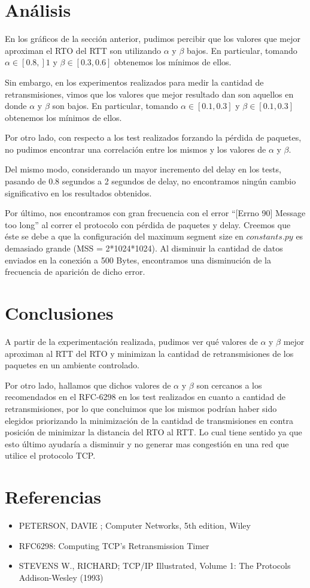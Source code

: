 \documentclass[10pt, a4paper]{article}
\begin{document}
\newpage
\section{Análisis}
En los gráficos de la sección anterior, pudimos percibir que los valores que mejor aproximan el RTO del RTT son utilizando $\alpha$ y $\beta$ bajos. En particular, tomando $ \alpha \in [0.8,]1$ y $ \beta \in [0.3,0.6]$ obtenemos los mínimos de ellos. 

Sin embargo, en los experimentos realizados para medir la cantidad de retransmisiones, vimos que los valores que mejor resultado dan son aquellos en donde $\alpha$ y $\beta$ son bajos. En particular, tomando $\alpha \in [0.1,0.3]$ y $\beta \in [0.1,0.3]$ obtenemos los mínimos de ellos.

Por otro lado, con respecto a los test realizados forzando la pérdida de paquetes, no pudimos encontrar una correlación entre los mismos y los valores de $\alpha$ y $\beta$.

Del mismo modo, considerando un mayor incremento del delay en los tests, pasando de 0.8 segundos a 2 segundos de delay, no encontramos ningún cambio significativo en los resultados obtenidos.

Por último, nos encontramos con gran frecuencia con el error ``[Errno 90] Message too long'' al correr el protocolo con pérdida de paquetes y delay. Creemos que éste se debe a que la configuración del maximum segment size en $constants.py$ es demasiado grande (MSS = 2*1024*1024). Al disminuir la cantidad de datos enviados en la conexión a 500 Bytes, encontramos una disminución de la frecuencia de aparición de dicho error.

\section{Conclusiones}
A partir de la experimentación realizada, pudimos ver qué valores de $\alpha$ y $\beta$ mejor aproximan al RTT del RTO y minimizan la cantidad de retransmisiones de los paquetes en un ambiente controlado.

Por otro lado, hallamos que dichos valores de $\alpha$ y $\beta$ son cercanos a los recomendados en el RFC-6298 en los test realizados en cuanto a cantidad de retransmisiones, por lo que concluimos que los mismos podrían haber sido elegidos priorizando la minimización de la cantidad de transmisiones en contra posición de minimizar la distancia del RTO al RTT. Lo cual tiene sentido ya que esto último ayudaría a disminuir y no generar mas congestión en una red que utilice el protocolo TCP.

\section{Referencias}
\begin{itemize}
\item PETERSON, DAVIE ; Computer Networks, 5th edition, Wiley

\item{RFC6298: Computing TCP's Retransmission Timer}

\item{STEVENS W., RICHARD; TCP/IP Illustrated, Volume 1: The Protocols Addison-Wesley (1993)}

\end{itemize}
\end{document}
